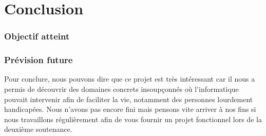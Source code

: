 \part{Conclusion}
	
	\section{Objectif atteint} %
	\label{sec:objectif_atteint}
	
	\section{Prévision future} %
	\label{sec:prévision_future}
	
	Pour conclure, nous pouvons dire que ce projet est très intéressant car il nous a permis de découvrir des domaines concrets insoupçonnés où l'informatique pouvait intervenir afin de faciliter la vie, notamment des personnes lourdement handicapées. Nous n'avons pas encore fini mais pensons vite arriver à nos fins si nous travaillons régulièrement afin de vous fournir un projet fonctionnel lors de la deuxième soutenance.
